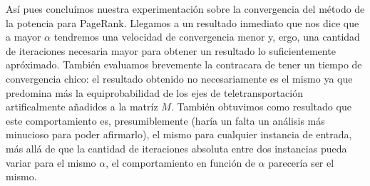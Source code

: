\par As\'i pues conclu\'imos nuestra experimentaci\'on sobre la convergencia del
m\'etodo de la potencia para PageRank. Llegamos a un resultado inmediato que nos
dice que a mayor $\alpha$ tendremos una velocidad de convergencia menor y, ergo,
una cantidad de iteraciones necesaria mayor para obtener un resultado lo
suficientemente apr\'oximado. Tambi\'en evaluamos brevemente la contracara de
tener un tiempo de convergencia chico: el resultado obtenido no necesariamente
es el mismo ya que predomina m\'as la equiprobabilidad de los ejes de
teletransportaci\'on artificalmente a\~nadidos a la matr\'iz $M$. Tambi\'en
obtuvimos como resultado que este comportamiento es, presumiblemente (har\'ia un
falta un an\'alisis m\'as minucioso para poder afirmarlo), el mismo para
cualquier instancia de entrada, m\'as all\'a de que la cantidad de iteraciones
absoluta entre dos instancias pueda variar para el mismo $\alpha$, el
comportamiento en funci\'on de $\alpha$ parecer\'ia ser el mismo.

